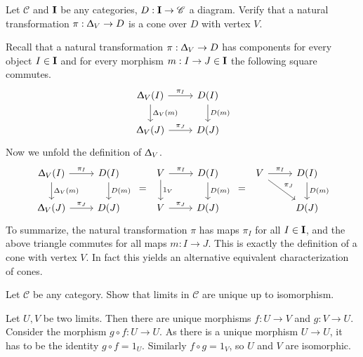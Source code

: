 \begin{exercise}
  Let $\mathscr{C}$ and $\bf{I}$ be any categories, $D : \bf{I} \to \mathscr{C}$ a diagram.
  Verify that a natural transformation $\pi : \Updelta_V \to D$ is a cone over $D$ with vertex $V$.
\end{exercise}
\begin{answer}
  Recall that a natural transformation $\pi : \Updelta_V \to D$ has components for every object $I \in \bf{I}$
  and for every morphism $m : I \to J \in \bf{I}$ the following square commutes.
  \[
    \begin{tikzcd}
      \Updelta_V (I) \arrow{r}{\pi_I}  \arrow{d}{\Updelta_V (m)}  & D(I) \arrow{d}{D(m)}    \\
      \Updelta_V (J) \arrow{r}{\pi_J}                & D(J)
    \end{tikzcd}
  \]
  Now we unfold the definition of $\Updelta_V$.
  \[
    \begin{tikzcd}
      \Updelta_V (I) \arrow{r}{\pi_I}  \arrow{d}{\Updelta_V (m)}  & D(I) \arrow{d}{D(m)}    \\
      \Updelta_V (J) \arrow{r}{\pi_J}                & D(J)
    \end{tikzcd}
    \ = \
    \begin{tikzcd}
      V \arrow{r}{\pi_I}  \arrow{d}{1_V}  & D(I) \arrow{d}{D(m)}    \\
      V \arrow{r}{\pi_J}                & D(J)
    \end{tikzcd}
    \ = \
    \begin{tikzcd}
      V \arrow{r}{\pi_I} \arrow{dr}{\pi_J} & D(I) \arrow{d}{D(m)}    \\
                     & D(J)
    \end{tikzcd}
  \]
  To summarize, the natural transformation $\pi$ has maps $\pi_I$ for all $I \in \bf{I}$,
  and the above triangle commutes for all maps $m : I \to J$.
  This is exactly the definition of a cone with vertex $V$.
  In fact this yields an alternative equivalent characterization of cones.
\end{answer}

\begin{exercise}
  Let $\mathscr{C}$ be any category. Show that limits in $\mathscr{C}$ are unique up to isomorphism.
\end{exercise}
\begin{answer}
  Let $U, V$ be two limits. Then there are unique morphisms $f : U \to V$ and $g : V \to U$.
  Consider the morphism $g \circ f : U \to U$. As there is a unique morphism $U \to U$, it has to be
  the identity $g \circ f = 1_U$.
  Similarly $f \circ g = 1_V$, so $U$ and $V$ are isomorphic.
\end{answer}

